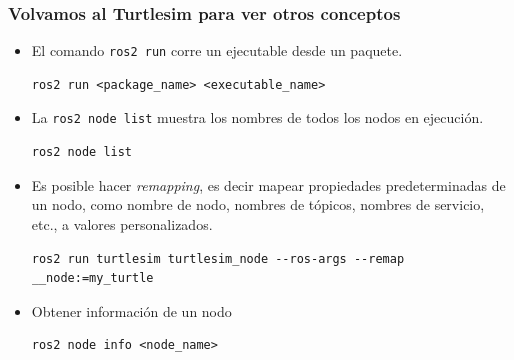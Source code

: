 \begin{frame}[fragile]
    \frametitle{Volvamos al Turtlesim para ver otros conceptos}
    
    \begin{itemize}
    

        \item El comando \lstinline[style=bash]{ros2 run} corre un ejecutable desde un paquete.
\begin{lstlisting}[style=bash]    
ros2 run <package_name> <executable_name>
\end{lstlisting}

        \item La \lstinline[style=bash]{ros2 node list} muestra los nombres de todos los nodos en ejecución.

\begin{lstlisting}[style=bash]    
ros2 node list
\end{lstlisting}

        \item Es posible hacer \emph{remapping}, es decir mapear propiedades predeterminadas de un nodo, como nombre de nodo, nombres de tópicos, nombres de servicio, etc., a valores personalizados.
    
\begin{lstlisting}[style=bash]    
ros2 run turtlesim turtlesim_node --ros-args --remap __node:=my_turtle
\end{lstlisting}

        \item Obtener información de un nodo
\begin{lstlisting}[style=bash]    
ros2 node info <node_name>
\end{lstlisting}

    \end{itemize}
\end{frame}

